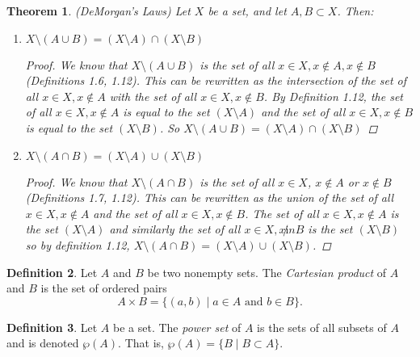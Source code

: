 \documentclass[12pt]{article}
\newtheorem{theorem}{Theorem}[section]
\theoremstyle{definition}
\newtheorem{definition}[theorem]{Definition}
\numberwithin{equation}{subsection}
\begin{document}
\begin{theorem}  (DeMorgan's Laws)
Let $X$ be a set, and let $A, B\subset X$.  Then:
\begin{enumerate}
\item
$X\setminus (A\cup B)=(X\setminus A)\cap (X\setminus B)$
\begin{proof}
We know that $X \setminus (A \cup B)$ is the set of all $x \in X, x \not \in A, x\not \in B$ (Definitions 1.6, 1.12). This can be rewritten as the intersection of the set of all $x \in X, x \not \in A$ with the set of all $x \in X, x \not \in B$. By Definition 1.12, the set of all $x \in X, x \not \in A$ is equal to the set $(X \setminus A)$ and the set of all $x \in X, x \not \in B$ is equal to the set $(X \setminus B)$. So $X \setminus (A \cup B) = (X \setminus A) \cap (X \setminus B)$
\end{proof}
\item
$X\setminus (A\cap B)=(X\setminus A)\cup (X\setminus B)$
\begin{proof}
We know that $X \setminus (A \cap B)$ is the set of all $x \in X$, $x \not \in A$ or $x \not \in B$ (Definitions 1.7, 1.12). This can be rewritten as the union of the set of all $x \in X, x \not \in A$ and the set of all $x \in X, x \not \in B$. The set of all $x \in X, x \not \in A$ is the set $(X \setminus A)$ and similarly the set of all $x \in X, x \not in B$ is the set $(X \setminus B)$ so by definition 1.12, $X \setminus (A \cap B) = (X \setminus A) \cup (X \setminus B)$.
\end{proof}
\end{enumerate}
\end{theorem}



\begin{definition}  Let $A$ and $B$ be two nonempty sets. 
The \emph{Cartesian product} of $A$ and $B$ is the set of ordered pairs
\[
A \times B = \{ (a, b) \mid \text{$a \in A$ and $b \in B$} \}.
\]
\end{definition}

\begin{definition}  Let $A$ be a set. 
The \emph{power set} of $A$ is the sets of all subsets of $A$ and is denoted $\wp(A)$.
That is, $\wp(A)=\{B\mid B\subset A\}$.
\end{definition}
\end{document}
